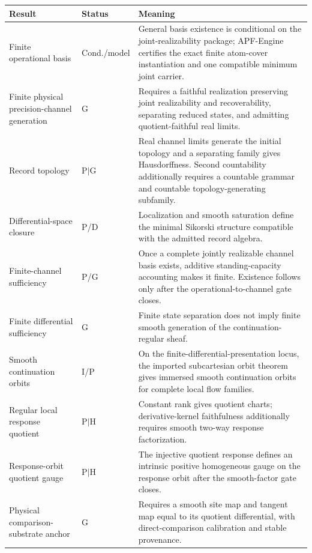 \documentclass[11pt]{article}
\theoremstyle{remark}
\newcommand{\Status}[1]{\textsf{#1}}
\begin{document}
\begin{longtable}{p{}p{}p{}}
\toprule
Result & Status & Meaning \\
\midrule
Finite operational basis & \Status{Cond./model} & General basis existence is conditional on the joint-realizability package; APF-Engine certifies the exact finite atom-cover instantiation and one compatible minimum joint carrier. \\
Finite physical precision-channel generation & \Status{G} & Requires a faithful realization preserving joint realizability and recoverability, separating reduced states, and admitting quotient-faithful real limits. \\
Record topology & \Status{P$\mid$G} & Real channel limits generate the initial topology and a separating family gives Hausdorffness.  Second countability additionally requires a countable grammar and countable topology-generating subfamily. \\
Differential-space closure & \Status{P/D} & Localization and smooth saturation define the minimal Sikorski structure compatible with the admitted record algebra. \\
Finite-channel sufficiency & \Status{P/G} & Once a complete jointly realizable channel basis exists, additive standing-capacity accounting makes it finite.  Existence follows only after the operational-to-channel gate closes. \\
Finite differential sufficiency & \Status{G} & Finite state separation does not imply finite smooth generation of the continuation-regular sheaf. \\
Smooth continuation orbits & \Status{I/P} & On the finite-differential-presentation locus, the imported subcartesian orbit theorem gives immersed smooth continuation orbits for complete local flow families. \\
Regular local response quotient & \Status{P$\mid$H} & Constant rank gives quotient charts; derivative-kernel faithfulness additionally requires smooth two-way response factorization. \\
Response-orbit quotient gauge & \Status{P$\mid$H} & The injective quotient response defines an intrinsic positive homogeneous gauge on the response orbit after the smooth-factor gate closes. \\
Physical comparison-substrate anchor & \Status{G} & Requires a smooth site map and tangent map equal to its quotient differential, with direct-comparison calibration and stable provenance. \\

\end{longtable}
\end{document}
